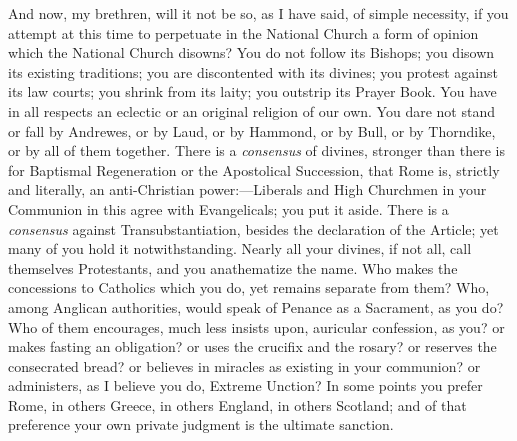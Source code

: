 And now, my brethren, will it not be so, as I have said, of simple
necessity, if you attempt at this time to perpetuate in the National
Church a form of opinion which the National Church disowns? You do not
follow its Bishops; you disown its existing traditions; you are
discontented with its divines; you protest against its law courts; you
shrink from its laity; you outstrip its Prayer Book. You have in all
respects an eclectic or an original religion of our own. You dare not
stand or fall by Andrewes, or by Laud, or by Hammond, or by Bull, or
by Thorndike, or by all of them together. There is a \emph{consensus}
of divines, stronger than there is for Baptismal Regeneration or the
Apostolical Succession, that Rome is, strictly and literally, an
anti-Christian power:—Liberals and High Churchmen in your Communion
in this agree with Evangelicals; you put it aside. There is a \emph{consensus}
against Transubstantiation, besides the declaration of the Article;
yet many of you hold it notwithstanding. Nearly all your divines, if
not all, call themselves Protestants, and you anathematize the name.
Who makes the concessions to Catholics which you do, yet remains
separate from them? Who, among Anglican authorities, would speak of
Penance as a Sacrament, as you do? Who of them encourages, much less
insists upon, auricular confession, as you? or makes fasting an
obligation? or uses the crucifix and the rosary? or reserves the
consecrated bread? or believes in miracles as existing in your
communion? or administers, as I believe you do, Extreme Unction? In
some points you prefer Rome, in others Greece, in others England, in
others Scotland; and of that preference your own private judgment is
the ultimate sanction.

